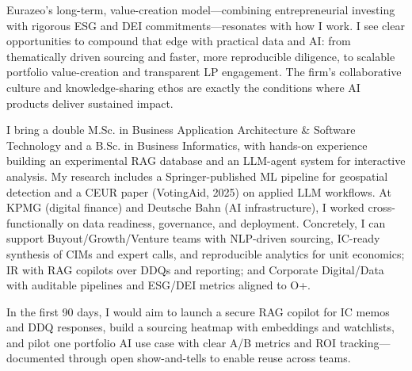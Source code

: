 Eurazeo’s long-term, value-creation model—combining entrepreneurial investing with rigorous ESG and DEI commitments—resonates with how I work. I see clear opportunities to compound that edge with practical data and AI: from thematically driven sourcing and faster, more reproducible diligence, to scalable portfolio value-creation and transparent LP engagement. The firm’s collaborative culture and knowledge-sharing ethos are exactly the conditions where AI products deliver sustained impact.

I bring a double M.Sc. in Business Application Architecture & Software Technology and a B.Sc. in Business Informatics, with hands-on experience building an experimental RAG database and an LLM-agent system for interactive analysis. My research includes a Springer-published ML pipeline for geospatial detection and a CEUR paper (VotingAid, 2025) on applied LLM workflows. At KPMG (digital finance) and Deutsche Bahn (AI infrastructure), I worked cross-functionally on data readiness, governance, and deployment. Concretely, I can support Buyout/Growth/Venture teams with NLP-driven sourcing, IC-ready synthesis of CIMs and expert calls, and reproducible analytics for unit economics; IR with RAG copilots over DDQs and reporting; and Corporate Digital/Data with auditable pipelines and ESG/DEI metrics aligned to O+.

In the first 90 days, I would aim to launch a secure RAG copilot for IC memos and DDQ responses, build a sourcing heatmap with embeddings and watchlists, and pilot one portfolio AI use case with clear A/B metrics and ROI tracking—documented through open show-and-tells to enable reuse across teams.